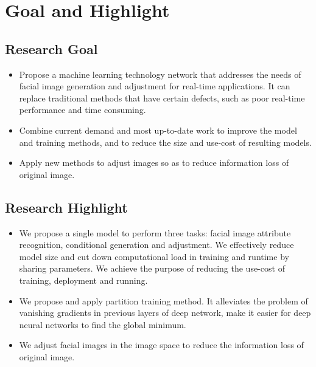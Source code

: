 \section{Goal and Highlight}

\subsection{Research Goal}
\begin{itemize}
\item
Propose a machine learning technology network that addresses the needs of facial image generation and adjustment for real-time applications.
It can replace traditional methods that have certain defects, such as poor real-time performance and time consuming.
\item
Combine current demand and most up-to-date work to improve the model and training methods,
    and to reduce the size and use-cost of resulting models.
\item
Apply new methods to adjust images so as to reduce information loss of original image.
\end{itemize}
\subsection{Research Highlight}
\begin{itemize}
\item
We propose a single model to perform three tasks: facial image attribute recognition,
    conditional generation and adjustment.
We effectively reduce model size and cut down computational load in training and runtime by sharing parameters.
We achieve the purpose of reducing the use-cost of training, deployment and running.
\item
We propose and apply partition training method.
It alleviates the problem of vanishing gradients in previous layers of deep network,
    make it easier for deep neural networks to find the global minimum.

\item
We adjust facial images in the image space to reduce the information loss of original image.
\end{itemize}